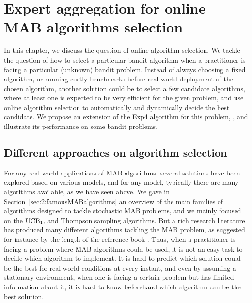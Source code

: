 
\chapter{Expert aggregation for online MAB algorithms selection}
\label{chapter:25}

\graphicspath{{2-Chapters/2-Chapter/Images/}}

\abstractStartChapter{}%
%
In this chapter, we discuss the question of online algorithm selection.
%
We tackle the question of how to select a particular bandit algorithm when a practitioner is facing a particular (unknown) bandit problem.
Instead of always choosing a fixed algorithm, or running costly benchmarks before real-world deployment of the chosen algorithm, another solution could be to select a few candidate algorithms, where at least one is expected to be very efficient for the given problem, and use online algorithm selection to automatically and dynamically decide the best candidate.
We propose an extension of the Exp4 algorithm for this problem, \Aggr, and illustrate its performance on some bandit problems.

\minitocStartChapter{}


\section{Different approaches on algorithm selection}
\label{sec:25:chooseYourPreferredBanditAlgorithm}

For any real-world applications of MAB algorithms,
several solutions have been explored based on various models, and for any model, typically there are many algorithms available, as we have seen above.
%
We gave in Section~\ref{sec:2:famousMABalgorithms} an overview of the main families of algorithms designed to tackle stochastic MAB problems, and we mainly focused on the $\mathrm{UCB}_1$, \klUCB{} and Thompson sampling algorithms.
But a rich research literature has produced many different algorithms tackling the MAB problem, as suggested for instance by the length of the reference book \cite{LattimoreBanditAlgorithmsBook}.
%
Thus, when a practitioner is facing a problem where MAB algorithms could be used, it is not an easy task to decide which algorithm to implement.
It is hard to predict which solution could be the best for real-world conditions at every instant,
and even by assuming a stationary environment, when one is facing a certain problem but has limited information about it, it is hard to know beforehand which algorithm can be the best solution.


